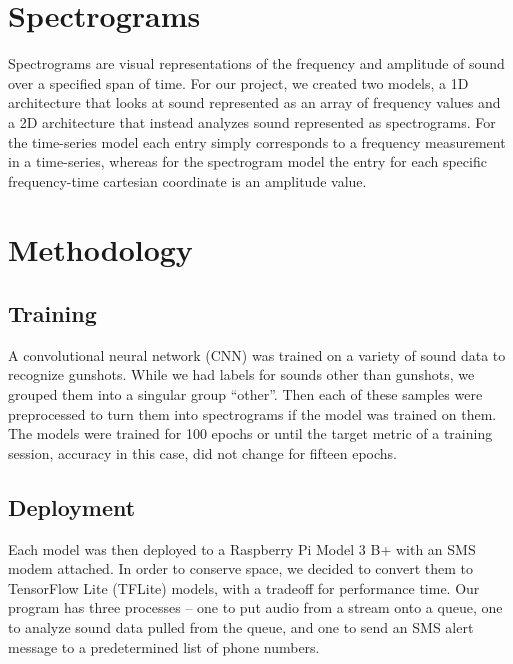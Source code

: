 \documentclass[conference]{IEEEtran}
\begin{document}
\begin{figure}[h!]
    \begin{flushleft}
        \texttt{[image: \{"2D CNN Architecture"]}.png}
        \caption{An illustration of our 2D CNN's architecture.}
        \label{fig:illustration1}
    \end{flushleft}
\end{figure}

\section{Spectrograms}
Spectrograms are visual representations of the frequency and amplitude of sound over a specified span of time. For our project, we created two models, a 1D architecture that looks at sound represented as an array of frequency values and a 2D architecture that instead analyzes sound represented as spectrograms. For the time-series model each entry simply corresponds to a frequency measurement in a time-series, whereas for the spectrogram model the entry for each specific frequency-time cartesian coordinate is an amplitude value.

\section{Methodology}
\subsection{Training}

A convolutional neural network (CNN) was trained on a variety of sound data to recognize gunshots. While we had labels for sounds other than gunshots, we grouped them into a singular group “other”. Then each of these samples were preprocessed to turn them into spectrograms if the model was trained on them. The models were trained for 100 epochs or until the target metric of a training session, accuracy in this case, did not change for fifteen epochs.

\subsection{Deployment}
Each model was then deployed to a Raspberry Pi Model 3 B+ with an SMS modem attached. In order to conserve space, we decided to convert them to TensorFlow Lite (TFLite) models, with a tradeoff for performance time. Our program has three processes – one to put audio from a stream onto a queue, one to analyze sound data pulled from the queue, and one to send an SMS alert message to a predetermined list of phone numbers.
\end{document}
